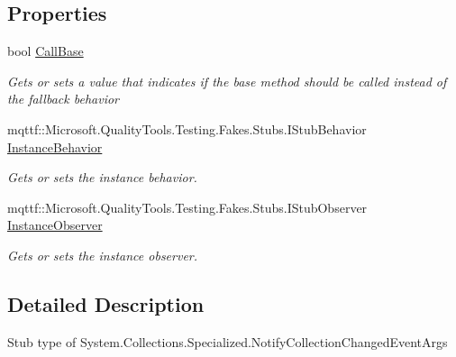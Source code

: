 \subsection*{Properties}
\begin{DoxyCompactItemize}
\item 
bool \hyperlink{class_system_1_1_collections_1_1_specialized_1_1_fakes_1_1_stub_notify_collection_changed_event_args_a4d34f5e79141bb04cc0929c22b2bacba}{Call\-Base}
\begin{DoxyCompactList}\small\item\em Gets or sets a value that indicates if the base method should be called instead of the fallback behavior\end{DoxyCompactList}\item 
mqttf\-::\-Microsoft.\-Quality\-Tools.\-Testing.\-Fakes.\-Stubs.\-I\-Stub\-Behavior \hyperlink{class_system_1_1_collections_1_1_specialized_1_1_fakes_1_1_stub_notify_collection_changed_event_args_abf3ed4fb1dd5099495f96251eeef0828}{Instance\-Behavior}
\begin{DoxyCompactList}\small\item\em Gets or sets the instance behavior.\end{DoxyCompactList}\item 
mqttf\-::\-Microsoft.\-Quality\-Tools.\-Testing.\-Fakes.\-Stubs.\-I\-Stub\-Observer \hyperlink{class_system_1_1_collections_1_1_specialized_1_1_fakes_1_1_stub_notify_collection_changed_event_args_afbff29243f41b09093d52eb78bab4cf0}{Instance\-Observer}
\begin{DoxyCompactList}\small\item\em Gets or sets the instance observer.\end{DoxyCompactList}\end{DoxyCompactItemize}


\subsection{Detailed Description}
Stub type of System.\-Collections.\-Specialized.\-Notify\-Collection\-Changed\-Event\-Args



